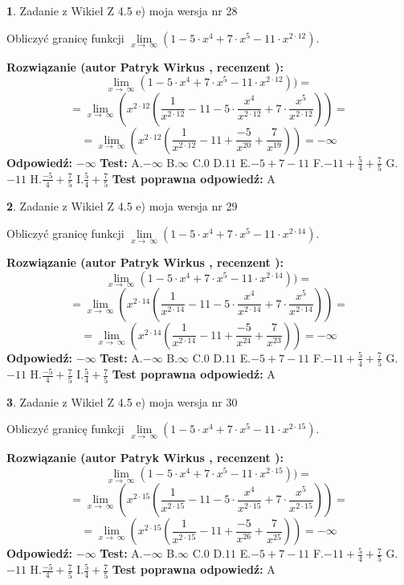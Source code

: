 \documentclass[12pt, a4paper]{article}
\theoremstyle{definition} %
\newtheorem{zad}{}
\newcommand{\zadStart}[1]{\begin{zad}#1\newline}
\newcommand{\zadStop}{\end{zad}}
\newcommand{\rozwStart}[2]{\noindent \textbf{Rozwiązanie (autor #1 , recenzent #2): }\newline}
\newcommand{\rozwStop}{\newline}
\newcommand{\odpStart}{\noindent \textbf{Odpowiedź:}\newline}
\newcommand{\odpStop}{\newline}
\newcommand{\testStart}{\noindent \textbf{Test:}\newline}
\newcommand{\testStop}{\newline}
\newcommand{\kluczStart}{\noindent \textbf{Test poprawna odpowiedź:}\newline}
\newcommand{\kluczStop}{\newline}
\begin{document}
\zadStart{Zadanie z Wikieł Z 4.5 e) moja wersja nr 28}



Obliczyć granicę funkcji  $\lim\limits_{x\to\ \infty}(1 - 5 \cdot x^{4}+7 \cdot x^{5}- 11 \cdot x^{2\cdot12})$.
\zadStop
\rozwStart{Patryk Wirkus}{}
$$\lim\limits_{x\to\ \infty}(1 - 5 \cdot x^{4}+7 \cdot x^{5}- 11 \cdot x^{2\cdot12}))=$$
$$=\lim\limits_{x\to\ \infty}(x^{2\cdot12}(\frac{1}{x^{2\cdot12}}-11 -5 \cdot \frac{x^{4}}{x^{2\cdot12}}+7 \cdot \frac{x^{5}}{x^{2\cdot12}}))=$$
$$=\lim\limits_{x\to\ \infty}(x^{2\cdot12}(\frac{1}{x^{2\cdot12}}-11 + \frac{-5}{x^{20}}+ \frac{7}{x^{19}}))=-\infty$$
\rozwStop
\odpStart
$-\infty$
\odpStop
\testStart
A.$-\infty$ B.$\infty$ C.$0$ D.$11$ E.$-5 + 7 - 11$
F.$-11+\frac{5}{4}+\frac{7}{5}$ G.$-11$
H.$\frac{-5}{4}+\frac{7}{5}$
I.$\frac{5}{4}+\frac{7}{5}$
\testStop
\kluczStart
A
\kluczStop



\zadStart{Zadanie z Wikieł Z 4.5 e) moja wersja nr 29}



Obliczyć granicę funkcji  $\lim\limits_{x\to\ \infty}(1 - 5 \cdot x^{4}+7 \cdot x^{5}- 11 \cdot x^{2\cdot14})$.
\zadStop
\rozwStart{Patryk Wirkus}{}
$$\lim\limits_{x\to\ \infty}(1 - 5 \cdot x^{4}+7 \cdot x^{5}- 11 \cdot x^{2\cdot14}))=$$
$$=\lim\limits_{x\to\ \infty}(x^{2\cdot14}(\frac{1}{x^{2\cdot14}}-11 -5 \cdot \frac{x^{4}}{x^{2\cdot14}}+7 \cdot \frac{x^{5}}{x^{2\cdot14}}))=$$
$$=\lim\limits_{x\to\ \infty}(x^{2\cdot14}(\frac{1}{x^{2\cdot14}}-11 + \frac{-5}{x^{24}}+ \frac{7}{x^{23}}))=-\infty$$
\rozwStop
\odpStart
$-\infty$
\odpStop
\testStart
A.$-\infty$ B.$\infty$ C.$0$ D.$11$ E.$-5 + 7 - 11$
F.$-11+\frac{5}{4}+\frac{7}{5}$ G.$-11$
H.$\frac{-5}{4}+\frac{7}{5}$
I.$\frac{5}{4}+\frac{7}{5}$
\testStop
\kluczStart
A
\kluczStop



\zadStart{Zadanie z Wikieł Z 4.5 e) moja wersja nr 30}



Obliczyć granicę funkcji  $\lim\limits_{x\to\ \infty}(1 - 5 \cdot x^{4}+7 \cdot x^{5}- 11 \cdot x^{2\cdot15})$.
\zadStop
\rozwStart{Patryk Wirkus}{}
$$\lim\limits_{x\to\ \infty}(1 - 5 \cdot x^{4}+7 \cdot x^{5}- 11 \cdot x^{2\cdot15}))=$$
$$=\lim\limits_{x\to\ \infty}(x^{2\cdot15}(\frac{1}{x^{2\cdot15}}-11 -5 \cdot \frac{x^{4}}{x^{2\cdot15}}+7 \cdot \frac{x^{5}}{x^{2\cdot15}}))=$$
$$=\lim\limits_{x\to\ \infty}(x^{2\cdot15}(\frac{1}{x^{2\cdot15}}-11 + \frac{-5}{x^{26}}+ \frac{7}{x^{25}}))=-\infty$$
\rozwStop
\odpStart
$-\infty$
\odpStop
\testStart
A.$-\infty$ B.$\infty$ C.$0$ D.$11$ E.$-5 + 7 - 11$
F.$-11+\frac{5}{4}+\frac{7}{5}$ G.$-11$
H.$\frac{-5}{4}+\frac{7}{5}$
I.$\frac{5}{4}+\frac{7}{5}$
\testStop
\kluczStart
A
\kluczStop
\end{document}
